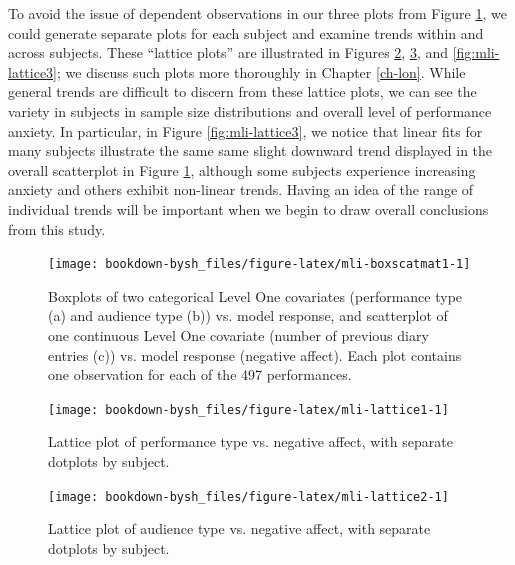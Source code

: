 \documentclass[
]{krantz}
\begin{document}
To avoid the issue of dependent observations in our three plots from Figure \ref{fig:mli-boxscatmat1}, we could generate separate plots for each subject and examine trends within and across subjects. These ``lattice plots'' are illustrated in Figures \ref{fig:mli-lattice1}, \ref{fig:mli-lattice2}, and \ref{fig:mli-lattice3}; we discuss such plots more thoroughly in Chapter \ref{ch-lon}. While general trends are difficult to discern from these lattice plots, we can see the variety in subjects in sample size distributions and overall level of performance anxiety. In particular, in Figure \ref{fig:mli-lattice3}, we notice that linear fits for many subjects illustrate the same same slight downward trend displayed in the overall scatterplot in Figure \ref{fig:mli-boxscatmat1}, although some subjects experience increasing anxiety and others exhibit non-linear trends. Having an idea of the range of individual trends will be important when we begin to draw overall conclusions from this study.

\begin{figure}

{\centering \texttt{[image: bookdown-bysh\_files/figure-latex/mli-boxscatmat1-1]} 

}

\caption{Boxplots of two categorical Level One covariates (performance type (a) and audience type (b)) vs. model response, and scatterplot of one continuous Level One covariate (number of previous diary entries (c)) vs. model response (negative affect).  Each plot contains one observation for each of the 497 performances.}\label{fig:mli-boxscatmat1}
\end{figure}

\begin{figure}

{\centering \texttt{[image: bookdown-bysh\_files/figure-latex/mli-lattice1-1]} 

}

\caption{Lattice plot of performance type vs. negative affect, with separate dotplots by subject.}\label{fig:mli-lattice1}
\end{figure}

\begin{figure}

{\centering \texttt{[image: bookdown-bysh\_files/figure-latex/mli-lattice2-1]} 

}

\caption{Lattice plot of audience type vs. negative affect, with separate dotplots by subject.}\label{fig:mli-lattice2}
\end{figure}
\end{document}
